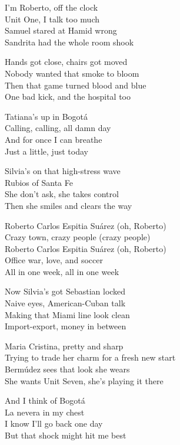 \begin{lyrics}
I’m Roberto, off the clock\\
Unit One, I talk too much\\
Samuel stared at Hamid wrong\\
Sandrita had the whole room shook

Hands got close, chairs got moved\\
Nobody wanted that smoke to bloom\\
Then that game turned blood and blue\\
One bad kick, and the hospital too

Tatiana’s up in Bogotá\\
Calling, calling, all damn day\\
And for once I can breathe\\
Just a little, just today

Silvia’s on that high-stress wave\\
Rubios of Santa Fe\\
She don’t ask, she takes control\\
Then she smiles and clears the way

Roberto Carlos Espitia Suárez
(oh, Roberto)\\
Crazy town, crazy people
(crazy people)\\
Roberto Carlos Espitia Suárez
(oh, Roberto)\\
Office war, love, and soccer\\
All in one week, all in one week

Now Silvia’s got Sebastian locked\\
Naive eyes, American-Cuban talk\\
Making that Miami line look clean\\
Import-export, money in between

Maria Cristina, pretty and sharp\\
Trying to trade her charm for a fresh new start\\
Bermúdez sees that look she wears\\
She wants Unit Seven, she’s playing it there

And I think of Bogotá\\
La nevera in my chest\\
I know I’ll go back one day\\
But that shock might hit me best


\end{lyrics}
